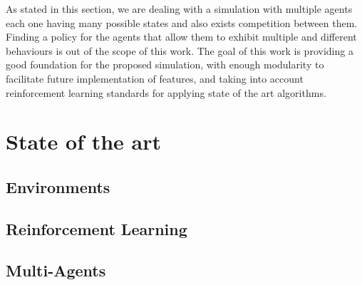 As stated in this section, we are dealing with a simulation with multiple agents each one having many possible states and also exists competition between them. Finding a policy for the agents that allow them to exhibit multiple and different behaviours is out of the scope of this work. The goal of this work is providing a good foundation for the proposed simulation, with enough modularity to facilitate future implementation of features, and taking into account reinforcement learning standards for applying state of the art algorithms.


\section{State of the art}

\subsection{Environments}

\subsection{Reinforcement Learning}

\subsection{Multi-Agents}

